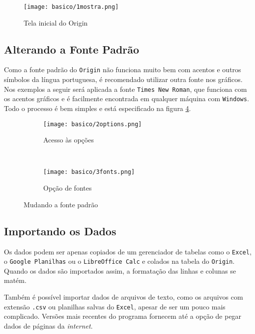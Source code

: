 \begin{figure}[H]
    \centering
    \texttt{[image: basico/1mostra.png]}

    \caption{Tela inicial do Origin}
    \label{fig:basico:mostragem}
\end{figure}

\subsection{Alterando a Fonte Padrão}

    Como a fonte padrão do \texttt{Origin} não funciona muito bem com acentos e outros símbolos da língua portuguesa, é recomendado utilizar outra fonte nos gráficos. Nos exemplos a seguir será aplicada a fonte \texttt{Times New Roman}, que funciona com os acentos gráficos e é facilmente encontrada em qualquer máquina com \texttt{Windows}. Todo o processo é bem simples e está especificado na figura \ref{fig:basico:mudar_fontes}.

    \begin{figure}[htbp]
        \centering
        \begin{subfigure}{0.45\textwidth}
            \centering
            \texttt{[image: basico/2options.png]}

            \caption{Acesso às opções}
            \label{fig:basico:options}
        \end{subfigure}
        ~
        \begin{subfigure}{0.45\textwidth}
            \centering
            \texttt{[image: basico/3fonts.png]}

            \caption{Opção de fontes}
            \label{fig:basico:fontes}
        \end{subfigure}
        \caption{Mudando a fonte padrão}
        \label{fig:basico:mudar_fontes}
    \end{figure}


\subsection{Importando os Dados}

    Os dados podem ser apenas copiados de um gerenciador de tabelas como o \texttt{Excel}, o \texttt{Google Planilhas} ou o \texttt{LibreOffice Calc} e colados na tabela do \texttt{Origin}. Quando os dados são importados assim, a formatação das linhas e colunas se matém.

    Também é possível importar dados de arquivos de texto, como os arquivos com extensão \texttt{.csv} ou planilhas salvas do \texttt{Excel}, apesar de ser um pouco mais complicado. Versões mais recentes do programa fornecem até a opção de pegar dados de páginas da \textit{internet}.

